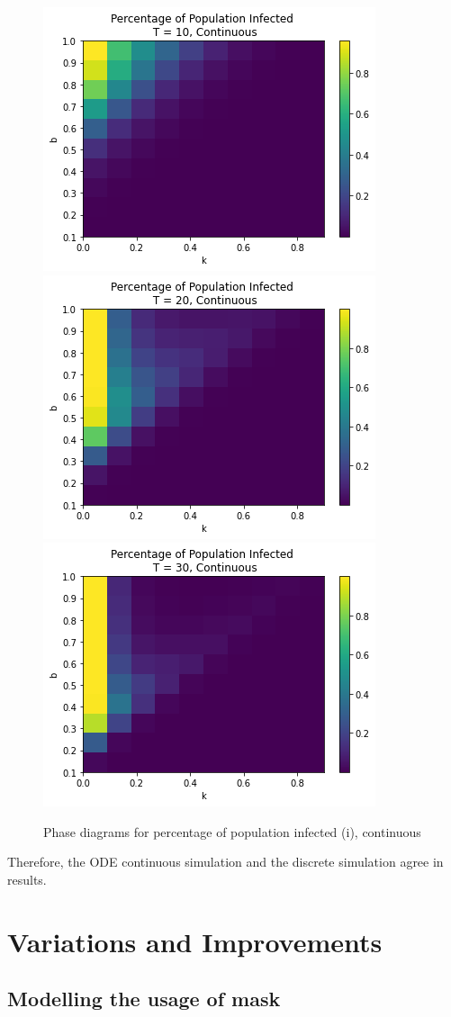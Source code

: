 \documentclass{article}
\begin{document}
\begin{figure}[htp]
\centering
\includegraphics[width=.3\textwidth]{Figure2_ode_infT10_bsmall.png}\hfill
\includegraphics[width=.3\textwidth]{Figure2_ode_infT20_bsmall.png}\hfill
\includegraphics[width=.3\textwidth]{Figure2_ode_infT30_bsmall.png}

\caption{Phase diagrams for percentage of population infected (i), continuous}
\label{fig:figure3}
\end{figure}



Therefore, the ODE continuous simulation and the discrete simulation agree in results.










\section{Variations and Improvements}
\subsection{Modelling the usage of mask}
\end{document}

